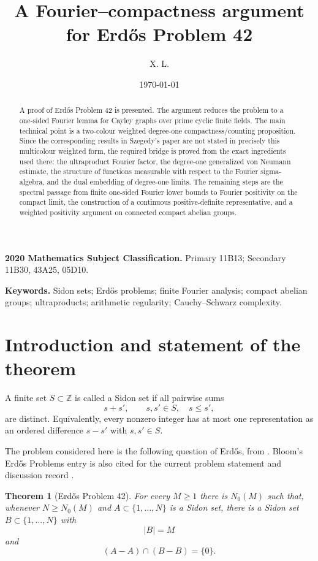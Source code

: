 \documentclass[11pt]{article}
\title{A Fourier--compactness argument for Erd\H{o}s Problem 42}
\author{X. L.}
\date{\today}
\numberwithin{equation}{section}
\newtheorem{theorem}{Theorem}[section]
\newcommand{\Z}{\mathbb Z}
\newcommand{\1}{\mathbf 1}
\begin{document}
\maketitle

\begin{abstract}
A proof of Erd\H{o}s Problem 42 is presented.  The argument reduces the
problem to a one-sided Fourier lemma for Cayley graphs over prime cyclic
finite fields.
The main technical point is a two-colour weighted degree-one
compactness/counting proposition.  Since the corresponding results in
Szegedy's paper are not stated in precisely this multicolour weighted form,
the required bridge is proved from the exact ingredients used there: the
ultraproduct Fourier factor, the degree-one generalized von Neumann
estimate, the structure of functions measurable with respect to the Fourier
sigma-algebra, and the dual embedding of degree-one limits.  The remaining
steps are the spectral passage from finite one-sided Fourier lower bounds
to Fourier positivity on the compact limit, the construction of a continuous
positive-definite representative, and a weighted positivity argument on
connected compact abelian groups.
\end{abstract}

\medskip
\noindent\textbf{2020 Mathematics Subject Classification.}
Primary 11B13; Secondary 11B30, 43A25, 05D10.

\medskip
\noindent\textbf{Keywords.}
Sidon sets; Erd\H{o}s problems; finite Fourier analysis; compact abelian groups;
ultraproducts; arithmetic regularity; Cauchy--Schwarz complexity.

\tableofcontents

\section{Introduction and statement of the theorem}

A finite set \(S\subset\Z\) is called a Sidon set if all pairwise sums
\[
        s+s',\qquad s,s'\in S,\quad s\le s',
\]
are distinct.  Equivalently, every nonzero integer has at most one
representation as an ordered difference \(s-s'\) with \(s,s'\in S\).

The problem considered here is the following question of Erd\H{o}s, from
\cite{Erdos1995}.  Bloom's Erd\H{o}s Problems entry is also cited for
the current problem statement and discussion record \cite{BloomErdos42}.

\begin{theorem}[Erd\H{o}s Problem 42]
\label{thm:erdos42}
For every \(M\ge 1\) there is \(N_0(M)\) such that, whenever
\(N\ge N_0(M)\) and \(A\subset\{1,\ldots,N\}\) is a Sidon set, there is a
Sidon set \(B\subset\{1,\ldots,N\}\) with
\[
        |B|=M
\]
and
\[
        (A-A)\cap(B-B)=\{0\}.
\]
\end{theorem}
\end{document}
